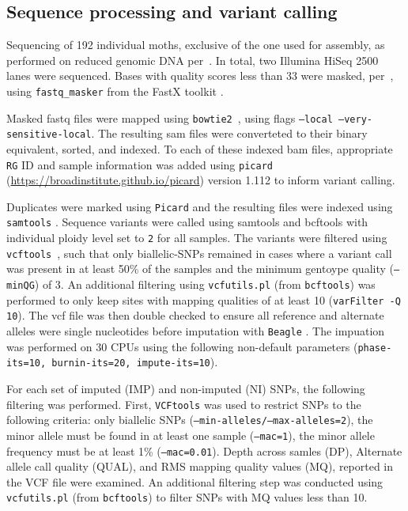 \documentclass[fleqn,11pt]{wlpeerj}
\begin{document}
\subsection*{Sequence processing and variant calling} Sequencing of 192
individual moths, exclusive of the one used for assembly,  as performed on
reduced genomic DNA per~\cite{PARCHMAN:2012ca}. In total, two  Illumina HiSeq
2500 lanes were sequenced. Bases with quality scores less than 33 were masked,
per~\cite{Yun:2014dn},  using \texttt{fastq\_masker} from the FastX toolkit
\citep[][version 0.0.14]{citeulike:9103573}.

Masked fastq files were mapped using \texttt{bowtie2}~\citep[][version
2.2.4]{Langmead:2012jh}, using flags  \texttt{--local
--very-sensitive-local}.  The resulting  sam files were converteted to their
binary equivalent, sorted, and indexed. To each of these indexed bam files,
appropriate \texttt{RG} ID and sample information was added using
\texttt{picard} \\ (\url{https://broadinstitute.github.io/picard}) version 1.112
to inform variant calling.

Duplicates were marked using \texttt{Picard} and the resulting files were
indexed using \texttt{samtools} \citep[][version 1.2]{Li:2009ka}.  Sequence
variants were called using samtools and bcftools \citep[][version
1.2]{Li:2009ka} with individual  ploidy level set to \texttt{2} for all samples.
The variants were filtered  using \texttt{vcftools}~\citep[][version
0.1.14]{Danecek:2011gz}, such that only biallelic-SNPs remained in cases where a
variant call was present in at least 50\% of the samples and the minimum
gentoype quality (\texttt{--minQG}) of 3. An additional filtering using
\texttt{vcfutils.pl} (from \texttt{bcftools}) was performed to only keep sites
with mapping qualities of at least 10 (\texttt{varFilter -Q 10}). The vcf file
was then double checked to ensure all reference and alternate alleles were
single nucleotides before imputation with \texttt{Beagle}
\citep[][version 4.0]{Browning:2007ge}.  The impuation was performed on 30 CPUs
using the following non-default parameters (\texttt{phase-its=10, burnin-its=20,
impute-its=10}).

For each set of imputed (IMP) and non-imputed (NI) SNPs, the following filtering
was performed.  First, \texttt{VCFtools} was used to restrict SNPs to the
following criteria: only biallelic SNPs
(\texttt{--min-alleles/--max-alleles=2}), the minor allele must be found in at
least one sample (\texttt{--mac=1}), the minor allele frequency must be at least
1\% (\texttt{--mac=0.01}).  Depth across samles (DP), Alternate allele call quality (QUAL),
and RMS mapping quality values (MQ), reported in the VCF file were examined.  An additional
filtering step was conducted using \texttt{vcfutils.pl} (from \texttt{bcftools}) to
filter SNPs with MQ values less than 10.
\end{document}
